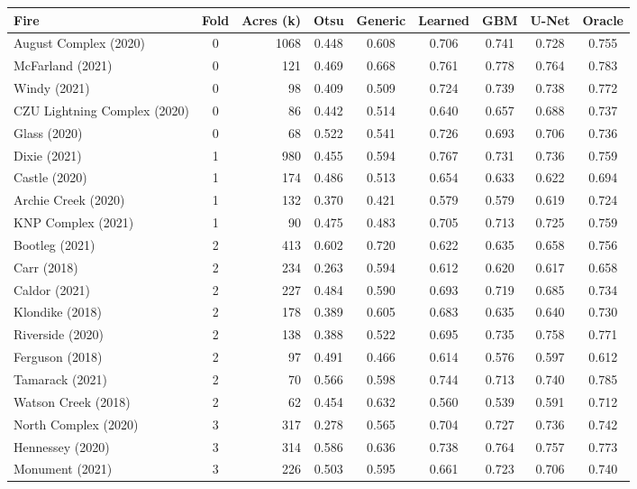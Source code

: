 \begin{table}[H]
\centering
\footnotesize
\setlength{\tabcolsep}{3pt}
\begin{tabular}{lcrcccccc}
\toprule
Fire & Fold & Acres (k) & Otsu & Generic & Learned & GBM & U-Net & Oracle \\
\midrule
August Complex (2020) & 0 & 1068 & 0.448 & 0.608 & 0.706 & 0.741 & 0.728 & 0.755 \\
McFarland (2021) & 0 & 121 & 0.469 & 0.668 & 0.761 & 0.778 & 0.764 & 0.783 \\
Windy (2021) & 0 & 98 & 0.409 & 0.509 & 0.724 & 0.739 & 0.738 & 0.772 \\
CZU Lightning Complex (2020) & 0 & 86 & 0.442 & 0.514 & 0.640 & 0.657 & 0.688 & 0.737 \\
Glass (2020) & 0 & 68 & 0.522 & 0.541 & 0.726 & 0.693 & 0.706 & 0.736 \\
Dixie (2021) & 1 & 980 & 0.455 & 0.594 & 0.767 & 0.731 & 0.736 & 0.759 \\
Castle (2020) & 1 & 174 & 0.486 & 0.513 & 0.654 & 0.633 & 0.622 & 0.694 \\
Archie Creek (2020) & 1 & 132 & 0.370 & 0.421 & 0.579 & 0.579 & 0.619 & 0.724 \\
KNP Complex (2021) & 1 & 90 & 0.475 & 0.483 & 0.705 & 0.713 & 0.725 & 0.759 \\
Bootleg (2021) & 2 & 413 & 0.602 & 0.720 & 0.622 & 0.635 & 0.658 & 0.756 \\
Carr (2018) & 2 & 234 & 0.263 & 0.594 & 0.612 & 0.620 & 0.617 & 0.658 \\
Caldor (2021) & 2 & 227 & 0.484 & 0.590 & 0.693 & 0.719 & 0.685 & 0.734 \\
Klondike (2018) & 2 & 178 & 0.389 & 0.605 & 0.683 & 0.635 & 0.640 & 0.730 \\
Riverside (2020) & 2 & 138 & 0.388 & 0.522 & 0.695 & 0.735 & 0.758 & 0.771 \\
Ferguson (2018) & 2 & 97 & 0.491 & 0.466 & 0.614 & 0.576 & 0.597 & 0.612 \\
Tamarack (2021) & 2 & 70 & 0.566 & 0.598 & 0.744 & 0.713 & 0.740 & 0.785 \\
Watson Creek (2018) & 2 & 62 & 0.454 & 0.632 & 0.560 & 0.539 & 0.591 & 0.712 \\
North Complex (2020) & 3 & 317 & 0.278 & 0.565 & 0.704 & 0.727 & 0.736 & 0.742 \\
Hennessey (2020) & 3 & 314 & 0.586 & 0.636 & 0.738 & 0.764 & 0.757 & 0.773 \\
Monument (2021) & 3 & 226 & 0.503 & 0.595 & 0.661 & 0.723 & 0.706 & 0.740 \\

\end{tabular}
\end{table}
